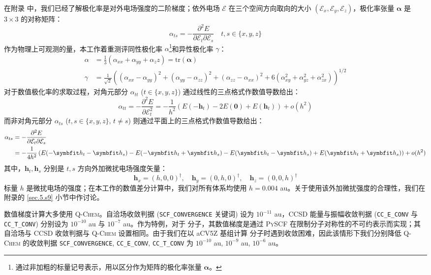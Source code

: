 在附录  中，我们已经了解极化率是对外电场强度的二阶梯度；依外电场 $\pmb{\mathcal{E}}$ 在三个空间方向取向的大小 $(\mathcal{E}_x, \mathcal{E}_y, \mathcal{E}_z)$，极化率张量 $\bm{\alpha}$ 是 $3 \times 3$ 的对称矩阵：
\begin{equation}
    \alpha_{ts} = - \frac{\partial^2 E}{\partial \mathcal{E}_t \partial \mathcal{E}_s} \quad t, s \in \{ x, y, z \}
\end{equation}
作为物理上可观测的量，本工作着重测评同性极化率 $\alpha$\footnote{通过非加粗的标量记号表示，用以区分作为矩阵的极化率张量 $\bm{\alpha}$。}和异性极化率 $\gamma$：
\begin{align}
    \alpha &= \frac{1}{3} \left( \alpha_{xx} + \alpha_{yy} + \alpha_zz \right) = \mathrm{tr} (\bm{\alpha}) \\
    \gamma &= \frac{1}{\sqrt{2}} \left( (\alpha_{xx} - \alpha_{yy})^2 + (\alpha_{yy} - \alpha_{zz})^2 + (\alpha_{zz} - \alpha_{xx})^2 + 6 (\alpha_{xy}^2 + \alpha_{yz}^2 + \alpha_{zx}^2) \right)^{1/2}
\end{align}
对于数值极化率的求取过程，对角元部分 $\alpha_{tt}$ ($t \in \{ x, y, z \}$) 通过线性的三点格式作数值导数给出：
\begin{equation}
    \label{eq.pol-findiff-alpha-def}
    \alpha_{tt} = - \frac{\partial^2 E}{\partial \mathcal{E}_t^2} = - \frac{1}{h^2} \left( E(- \bm{h}_t) - 2 E(\bm{0}) + E(\bm{h}_t) \right) + o(h^2)
\end{equation}
而非对角元部分 $\alpha_{ts}$ ($t, s \in \{ x, y, z \}, \, t \neq s$) 则通过平面上的三点格式作数值导数给出：
\begin{align}
    \label{eq.pol-findiff-gamma-def}
    \alpha_{ts} &= - \frac{\partial^2 E}{\partial \mathcal{E}_t \partial \mathcal{E}_s} \notag\\
    &= - \frac{1}{4h^2} \left( E(- \bm{h}_t - \bm{h}_s) - E(- \bm{h}_t + \bm{h}_s) - E(\bm{h}_t - \bm{h}_s) + E(\bm{h}_t + \bm{h}_s) \right) + o(h^2)
\end{align}
其中，$\bm{h}_t, \bm{h}_s$ 分别是 $t, s$ 方向外加微扰电场强度矢量：
\begin{equation*}
    \bm{h}_x = (h, 0, 0)^\dagger, \quad \bm{h}_y = (0, h, 0)^\dagger, \quad \bm{h}_z = (0, 0, h)^\dagger
\end{equation*}
标量 $h$ 是微扰电场的强度；在本工作的数值差分计算中，我们对所有体系均使用 $h = 0.004$ au。关于使用该外加微扰强度的合理性，我们在附录的 \ref{sec.5.s9} 小节中作讨论。

数值梯度计算大多使用 \textsc{Q-Chem}\cite{Shao-Head-Gordon.MP.2015}。自洽场收敛判据 (\texttt{SCF\_CONVERGENCE} 关键词) 设为 $10^{-11}$ au，CCSD 能量与振幅收敛判据 (\texttt{CC\_E\_CONV} 与 \texttt{CC\_T\_CONV}) 分别设为 $10^{-10}$ au 与 $10^{-7}$ au。作为特例，对于  分子，其数值梯度是通过 \textsc{PySCF} 在限制分子对称性的不可约表示而实现；其自洽场与 CCSD 收敛判据与 \textsc{Q-Chem} 设置相同。由于我们在以 aCV5Z 基组计算  分子时遇到收敛困难，因此该情形下我们分别降低 \textsc{Q-Chem} 的收敛判据 \texttt{SCF\_CONVERGENCE}, \texttt{CC\_E\_CONV}, \texttt{CC\_T\_CONV} 为 $10^{-10}$ au, $10^{-9}$ au, $10^{-6}$ au。

